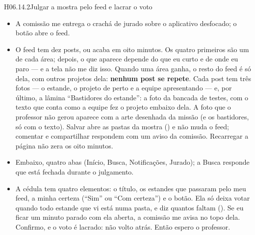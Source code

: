 \begin{historia}{H06.14.2}{Julgar a mostra pelo feed e lacrar o voto}{\parcial}
\aceite
\begin{itemize}
  \item A comissão me entrega o crachá de jurado sobre o aplicativo
    desfocado; o botão abre o feed.
  \item O feed tem dez posts, ou acaba em oito minutos. Os quatro primeiros
    são um de cada área; depois, o que aparece depende do que eu curto e de
    onde eu paro --- e a tela não me diz isso. Quando uma área ganha, o resto
    do feed é só dela, com outros projetos dela: \textbf{nenhum post se
    repete}. Cada post tem três fotos --- o estande, o projeto de perto e a
    equipe apresentando --- e, por último, a lâmina \enquote{Bastidores do
    estande}: a foto da bancada de testes, com o texto que conta como a
    equipe fez o projeto embaixo dela. A foto que o professor não gerou
    aparece com a arte desenhada da missão (e os bastidores, só com o
    texto).
    Salvar abre as pastas da mostra () e não muda o feed;
    comentar e compartilhar respondem com um aviso da comissão. Recarregar a página não zera os oito minutos.
  \item Embaixo, quatro abas (Início, Busca, Notificações, Jurado); a Busca
    responde que está fechada durante o julgamento.
  \item A cédula tem quatro elementos: o título, os estandes que passaram
    pelo meu feed, a minha certeza (\enquote{Sim} ou \enquote{Com certeza}) e
    o botão. Ela só deixa votar quando todo estande que vi está numa pasta, e
    diz quantos faltam (). Se eu ficar um minuto parado com ela
    aberta, a comissão me avisa no topo dela. Confirmo, e o voto é lacrado:
    não volto atrás. Então espero o professor.
\end{itemize}
\end{historia}


